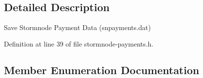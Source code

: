 \subsection{Detailed Description}
Save Stormnode Payment Data (snpayments.\+dat) 

Definition at line 39 of file stormnode-\/payments.\+h.



\subsection{Member Enumeration Documentation}
\hypertarget{class_c_stormnode_payment_d_b_a2f73dffc05c6751f0c323af60245ea23}{}
